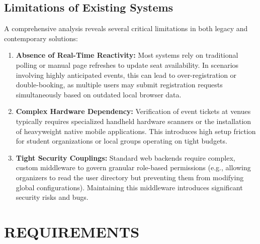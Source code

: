 \documentclass[14pt,a4paper]{extreport}
\begin{document}
\section{Limitations of Existing Systems}
A comprehensive analysis reveals several critical limitations in both legacy and contemporary solutions:
\begin{enumerate}
    \item \textbf{Absence of Real-Time Reactivity:} Most systems rely on traditional polling or manual page refreshes to update seat availability. In scenarios involving highly anticipated events, this can lead to over-registration or double-booking, as multiple users may submit registration requests simultaneously based on outdated local browser data.
    \item \textbf{Complex Hardware Dependency:} Verification of event tickets at venues typically requires specialized handheld hardware scanners or the installation of heavyweight native mobile applications. This introduces high setup friction for student organizations or local groups operating on tight budgets.
    \item \textbf{Tight Security Couplings:} Standard web backends require complex, custom middleware to govern granular role-based permissions (e.g., allowing organizers to read the user directory but preventing them from modifying global configurations). Maintaining this middleware introduces significant security risks and bugs.
\end{enumerate}

\chapter{REQUIREMENTS}
\end{document}
